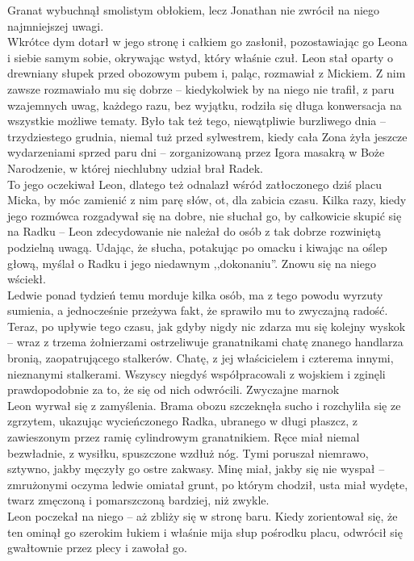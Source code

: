 \documentclass[../MAIN.tex]{subfiles}
\begin{document}
Granat wybuchnął smolistym obłokiem, lecz Jonathan nie zwrócił na niego najmniejszej uwagi.\\ Wkrótce dym dotarł w jego stronę i całkiem go zasłonił, pozostawiając go Leona i siebie samym sobie, okrywając wstyd, który właśnie czuł.
%
%
Leon stał oparty o drewniany słupek przed obozowym pubem i, paląc, rozmawiał z Mickiem. Z nim zawsze rozmawiało mu się dobrze -- kiedykolwiek by na niego nie trafił, z paru wzajemnych uwag, każdego razu, bez wyjątku, rodziła się długa konwersacja na wszystkie możliwe tematy. Było tak też tego, niewątpliwie burzliwego dnia -- trzydziestego grudnia, niemal tuż przed sylwestrem, kiedy cała Zona żyła jeszcze wydarzeniami sprzed paru dni -- zorganizowaną przez Igora masakrą w Boże Narodzenie, w której niechlubny udział brał Radek.\\
To jego oczekiwał Leon, dlatego też odnalazł wśród zatłoczonego dziś placu Micka, by móc zamienić z nim parę słów, ot, dla zabicia czasu. Kilka razy, kiedy jego rozmówca rozgadywał się na dobre, nie słuchał go, by całkowicie skupić się na Radku -- Leon zdecydowanie nie należał do osób z tak dobrze rozwiniętą podzielną uwagą. Udając, że słucha, potakując po omacku i kiwając na oślep głową, myślał o Radku i jego niedawnym ,,dokonaniu''. Znowu się na niego wściekł.\\
Ledwie ponad tydzień temu morduje kilka osób, ma z tego powodu wyrzuty sumienia, a jednocześnie przeżywa fakt, że sprawiło mu to zwyczajną radość. Teraz, po upływie tego czasu, jak gdyby nigdy nic zdarza mu się kolejny wyskok -- wraz z trzema żołnierzami ostrzeliwuje granatnikami chatę znanego handlarza bronią, zaopatrującego stalkerów. Chatę, z jej właścicielem i czterema innymi, nieznanymi stalkerami. Wszyscy niegdyś współpracowali z wojskiem i zginęli prawdopodobnie za to, że się od nich odwrócili. Zwyczajne marno\3k\\
Leon wyrwał się z zamyślenia. Brama obozu szczeknęła sucho i rozchyliła się ze zgrzytem, ukazując wycieńczonego Radka, ubranego w długi płaszcz, z zawieszonym przez ramię cylindrowym granatnikiem. Ręce miał niemal bezwładnie, z wysiłku, spuszczone wzdłuż nóg. Tymi poruszał niemrawo, sztywno, jakby męczyły go ostre zakwasy. Minę miał, jakby się nie wyspał -- zmrużonymi oczyma ledwie omiatał grunt, po którym chodził, usta miał wydęte, twarz zmęczoną i pomarszczoną bardziej, niż zwykle.\\
Leon poczekał na niego -- aż zbliży się w stronę baru. Kiedy zorientował się, że ten ominął go szerokim łukiem i właśnie mija słup pośrodku placu, odwrócił się gwałtownie przez plecy i zawołał go.\\
\end{document}
